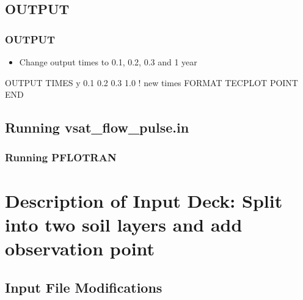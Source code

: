\documentclass{beamer}
\newcommand\bluecomment[1]{{{\color{blue} #1}}}
\newcommand\magentacomment[1]{{{\color{magenta} #1}}}
\begin{document}
\subsection{OUTPUT}

\begin{frame}[fragile]\frametitle{OUTPUT}

\begin{itemize}
\item Change output times to 0.1, 0.2, 0.3 and 1 year
\end{itemize}


\begin{semiverbatim}

OUTPUT
  TIMES y \magentacomment{0.1 0.2 0.3 1.0}     \bluecomment{! new times}
  FORMAT TECPLOT POINT
END

\end{semiverbatim}

\end{frame}

\subsection{Running vsat_flow_pulse.in}

\begin{frame}[fragile]\frametitle{Running PFLOTRAN}


\end{frame}

\section{Description of Input Deck: Split into two soil layers and add observation point}

\subsection{Input File Modifications}
\end{document}

